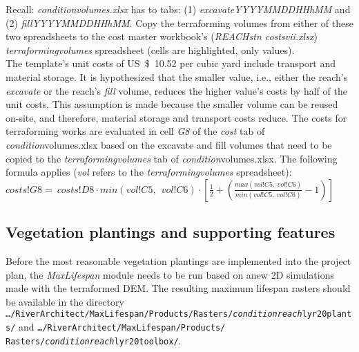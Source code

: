 Recall: \emph{condition{\myUnderscore}volumes.xlsx} has to tabs: (1) \emph{excavate{\myUnderscore}YYYYMMDD{\myUnderscore}HHhMM} and (2) \emph{fill{\myUnderscore}YYYYMMDD{\myUnderscore}HHhMM}. Copy the terraforming volumes from either of these two spreadsheets to
the cost master workbook's (\emph{REACH{\myUnderscore}stn{\myUnderscore} costs{\myUnderscore}vii.xlsx}) \emph{terraforming{\myUnderscore}volumes} spreadsheet (cells are highlighted, only values).\\

The template's unit costs of US~\$~10.52 per cubic yard include transport and material storage. It is hypothesized that the smaller value, i.e., either the reach's \emph{excavate} or the reach's \emph{fill} volume, reduces the higher value's costs by half of the unit costs. This assumption is made because the smaller volume can be reused on-site, and therefore, material storage and transport costs reduce. The costs for terraforming works are evaluated in cell \emph{G8} of the \emph{cost} tab of \emph{condition}{\myUnderscore}volumes.xlsx based on the excavate and fill volumes that need to be copied to the \emph{terraforming{\myUnderscore}volumes} tab of \emph{condition}{\myUnderscore}volumes.xlsx. The following formula applies (\emph{vol} refers to the \emph{terraforming{\myUnderscore}volumes} spreadsheet):\\

\(costs!G8 = \ costs!D8 \cdot min(vol!C5,\ \ vol!C6) \cdot \left\lbrack \frac{1}{2} + \left( \frac{max(vol!C5,\ vol!C6)}{min(vol!C5,\ vol!C6)} - 1 \right) \right\rbrack\)



\subsection{Vegetation plantings and supporting features}

Before the most reasonable vegetation plantings are implemented into the project plan, the \emph{MaxLifespan} module needs to be run based on anew 2D simulations made with the terraformed DEM. The resulting maximum lifespan rasters should be available in the directory
\texttt{\ldots{}/RiverArchitect/MaxLifespan/Products/Rasters/\emph{condition}{\myUnderscore}\emph{reach}{\myUnderscore}lyr20{\myUnderscore}plants/} and \texttt{\ldots{}/RiverArchitect/MaxLifespan/Products/}\\\texttt{Rasters/\emph{condition}{\myUnderscore}\emph{reach}{\myUnderscore}lyr20{\myUnderscore}toolbox/}.

